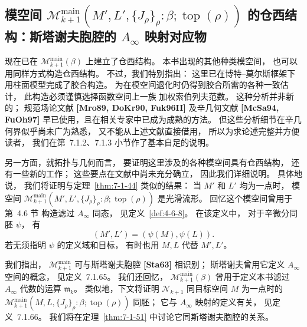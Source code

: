 
\subsection[\texorpdfstring{$\mathcal M^{\mathrm{main}}_{k+1}(\cdots;\operatorname{top}(\rho))$ 的仓西结构：斯塔谢夫胞腔的 $A_\infty$ 映射对应物}{M main k+1(...;top(rho)) 的仓西结构：斯塔谢夫胞腔的 A infinity 映射对应物}]{%
模空间
$\mathcal M^{\mathrm{main}}_{k+1}
(M',L',\{J_\rho\}_\rho:\beta;\operatorname{top}(\rho))$
的仓西结构：斯塔谢夫胞腔的 $A_\infty$ 映射对应物}
\label{subsec:7-1-5}

现在已在
$\mathcal M^{\mathrm{main}}_{k+1}(\beta)$
上建立了仓西结构。
本书出现的其他种类模空间，
也可以用同样方式构造仓西结构。
不过，我们特别指出：
这里已在博特--莫尔斯框架下
用柱面模型完成了胶合构造。
为在模空间退化时仍得到胶合所需的各种一致估计，
此构造必须谨慎选择函数空间上一族
加权索伯列夫范数。
这种分析并非新的；
规范场论文献 \textbf{[Mro89, DoKr90, Fuk96II]}
及辛几何文献 \textbf{[McSa94, FuOh97]}
早已使用，且在相关专家中已成为成熟的方法。
但这些分析细节在辛几何界似乎尚未广为熟悉，
又不能从上述文献直接借用，
所以为求论述完整并方便读者，
我们在第~7.1.2、7.1.3 小节作了基本自足的说明。

另一方面，就拓扑与几何而言，
要证明这里涉及的各种模空间具有仓西结构，
还有一些新的工作；
这些要点在文献中尚未充分确立，
因此我们详细说明。
具体地说，
我们将证明与定理~\ref{thm:7-1-44} 类似的结果：
当 $M'$ 和 $L'$ 均为一点时，
模空间
$\mathcal M^{\mathrm{main}}_{k+1}
(M',L',\{J_\rho\}_\rho:\beta;\operatorname{top}(\rho))$
是光滑流形。
回忆这个模空间曾用于第~4.6 节
构造滤过 $A_\infty$ 同态，
见定义~\ref{def:4-6-8}。
在该定义中，
对于辛微分同胚 $\psi$，
有
\[
(M',L')=(\psi(M),\psi(L)).
\]
若无须指明 $\psi$ 的定义域和目标，
有时也用 $M,L$ 代替 $M',L'$。

我们指出，
$\mathcal M^{\mathrm{main}}_{k+1}$
可与斯塔谢夫胞腔 \textbf{[Sta63]} 相识别；
斯塔谢夫曾用它定义
$A_\infty$ 空间的概念，
见定义~7.1.65。
我们还回忆，
$\mathcal M^{\mathrm{main}}_{k+1}(\beta)$
曾用于定义本书滤过 $A_\infty$ 代数的运算
$\mathfrak m_k$。
类似地，下文将证明
$\mathcal N_{k+1}$
同目标空间 $M$ 为一点时的
$\mathcal M^{\mathrm{main}}_{k+1}
(M,L,\{J_\rho\}_\rho:\beta;\operatorname{top}(\rho))$
同胚；
它与 $A_\infty$ 映射的定义有关，
见定义~7.1.66。
我们将在定理~\ref{thm:7-1-51}
中讨论它同斯塔谢夫胞腔的关系。

